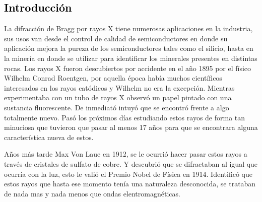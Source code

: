 \textcolor{black}{\section{Introducción}}

\noindent La difracción de Bragg por rayos X tiene numerosas aplicaciones en la industria, sus usos van desde el control de calidad de semiconductores en donde su aplicación mejora la pureza de los semiconductores tales como el silicio, hasta en la minería en donde se utilizar para identificar los minerales presentes en distintas rocas. Los rayos X fueron descubiertos por accidente en el año 1895 por el físico Wilhelm Conrad Roentgen, por aquella época había muchos científicos interesados en los rayos catódicos y Wilhelm no era la excepción. Mientras experimentaba con un tubo de rayos X observó un papel pintado con una sustancia fluorescente. De inmediató intuyó que se encontró frente a algo totalmente nuevo. Pasó los próximos días estudiando estos rayos de forma tan minuciosa que tuvieron que pasar al menos 17 años para que se encontrara alguna característica nueva de estos. 

Años más tarde Max Von Laue en 1912, se le ocurrió hacer pasar estos rayos a través de cristales de sulfato de cobre. Y descubrió que se difractaban al igual que ocurría con la luz, esto le valió el Premio Nobel de Física en 1914. Identificó que estos rayos que hasta ese momento tenía una naturaleza desconocida, se trataban de nada mas y nada menos que ondas elentromagnéticas. 

